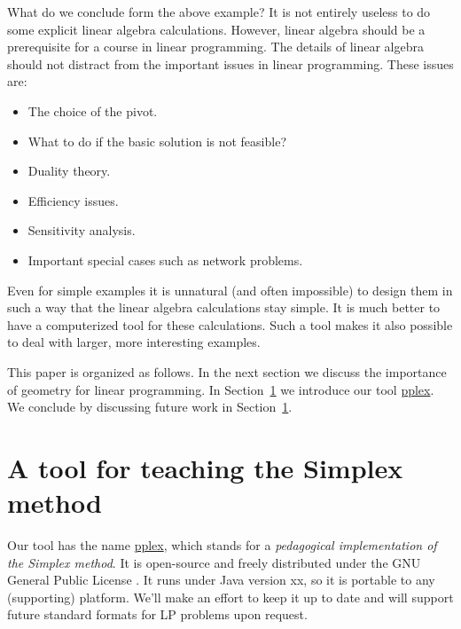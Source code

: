 \documentclass[ukenglish]{nik}
\begin{document}
What do we conclude form the above example? It is not entirely useless to do some explicit
linear algebra calculations. However, linear algebra should be a prerequisite for a course
in linear programming. The details of linear algebra should not distract from the important
issues in linear programming. These issues are:
\begin{itemize}
\item The choice of the pivot.
\item What to do if the basic solution is not feasible?
\item Duality theory.
\item Efficiency issues.
\item Sensitivity analysis.
\item Important special cases such as network problems.
\end{itemize}
Even for simple examples it is unnatural (and often impossible)
to design them in such a way that the linear algebra calculations stay simple.
It is much better to have a computerized tool for these calculations. Such a tool makes
it also possible to deal with larger, more interesting examples. 

This paper is organized as follows. In the next section we discuss the importance of
geometry for linear programming. In Section~\ref{} we introduce our tool \url{pplex}.
We conclude by discussing future work in Section~\ref{}.


\section{A tool for teaching the Simplex method}
Our tool has the name \url{pplex},
which stands for a \emph{pedagogical implementation of the Simplex method}.
It is open-source \cite{pplex} and freely distributed under the 
GNU General Public License \cite{GNUGPL}.
It runs under Java version xx, so it is portable to any (supporting) platform.
We'll make an effort to keep it up to date and will support future standard
formats for LP problems upon request.
\end{document}
